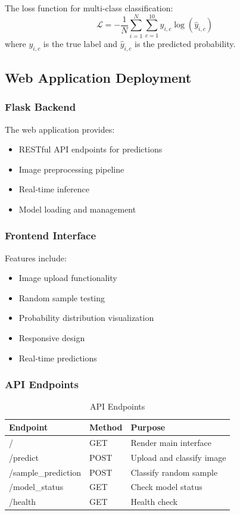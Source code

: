 \documentclass[12pt,a4paper]{article}
\begin{document}
The loss function for multi-class classification:
\begin{equation}
\mathcal{L} = -\frac{1}{N}\sum_{i=1}^{N}\sum_{c=1}^{10} y_{i,c} \log(\hat{y}_{i,c})
\end{equation}
where $y_{i,c}$ is the true label and $\hat{y}_{i,c}$ is the predicted probability.

\subsection{Web Application Deployment}

\subsubsection{Flask Backend}
The web application provides:
\begin{itemize}
    \item RESTful API endpoints for predictions
    \item Image preprocessing pipeline
    \item Real-time inference
    \item Model loading and management
\end{itemize}

\subsubsection{Frontend Interface}
Features include:
\begin{itemize}
    \item Image upload functionality
    \item Random sample testing
    \item Probability distribution visualization
    \item Responsive design
    \item Real-time predictions
\end{itemize}

\subsubsection{API Endpoints}
\begin{table}[H]
\centering
\caption{API Endpoints}
\begin{tabular}{lll}
\toprule
\textbf{Endpoint} & \textbf{Method} & \textbf{Purpose} \\
\midrule
/ & GET & Render main interface \\
/predict & POST & Upload and classify image \\
/sample\_prediction & POST & Classify random sample \\
/model\_status & GET & Check model status \\
/health & GET & Health check \\
\bottomrule
\end{tabular}
\end{table}
\end{document}
